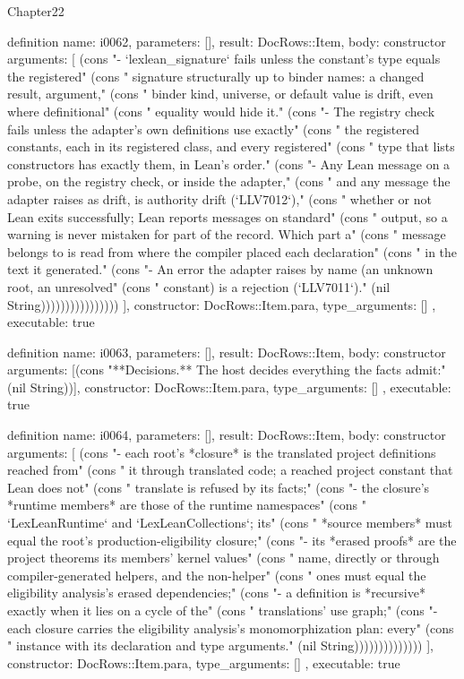 \begin{lexlean}{Chapter22}
\begin{semanticmodule}
definition{
  name: i0062,
  parameters: [],
  result: DocRows::Item,
  body: constructor{
    arguments: [
      (cons "- `lexlean_signature` fails unless the constant's type equals the registered" (cons "  signature structurally up to binder names: a changed result, argument," (cons "  binder kind, universe, or default value is drift, even where definitional" (cons "  equality would hide it." (cons "- The registry check fails unless the adapter's own definitions use exactly" (cons "  the registered constants, each in its registered class, and every registered" (cons "  type that lists constructors has exactly them, in Lean's order." (cons "- Any Lean message on a probe, on the registry check, or inside the adapter," (cons "  and any message the adapter raises as drift, is authority drift (`LLV7012`)," (cons "  whether or not Lean exits successfully; Lean reports messages on standard" (cons "  output, so a warning is never mistaken for part of the record. Which part a" (cons "  message belongs to is read from where the compiler placed each declaration" (cons "  in the text it generated." (cons "- An error the adapter raises by name (an unknown root, an unresolved" (cons "  constant) is a rejection (`LLV7011`)." (nil String))))))))))))))))
    ],
    constructor: DocRows::Item.para,
    type_arguments: []
  },
  executable: true
}

definition{
  name: i0063,
  parameters: [],
  result: DocRows::Item,
  body: constructor{
    arguments: [(cons "**Decisions.** The host decides everything the facts admit:" (nil String))],
    constructor: DocRows::Item.para,
    type_arguments: []
  },
  executable: true
}

definition{
  name: i0064,
  parameters: [],
  result: DocRows::Item,
  body: constructor{
    arguments: [
      (cons "- each root's *closure* is the translated project definitions reached from" (cons "  it through translated code; a reached project constant that Lean does not" (cons "  translate is refused by its facts;" (cons "- the closure's *runtime members* are those of the runtime namespaces" (cons "  `LexLeanRuntime` and `LexLeanCollections`; its" (cons "  *source members* must equal the root's production-eligibility closure;" (cons "- its *erased proofs* are the project theorems its members' kernel values" (cons "  name, directly or through compiler-generated helpers, and the non-helper" (cons "  ones must equal the eligibility analysis's erased dependencies;" (cons "- a definition is *recursive* exactly when it lies on a cycle of the" (cons "  translations' use graph;" (cons "- each closure carries the eligibility analysis's monomorphization plan: every" (cons "  instance with its declaration and type arguments." (nil String))))))))))))))
    ],
    constructor: DocRows::Item.para,
    type_arguments: []
  },
  executable: true
}


\end{semanticmodule}
\end{lexlean}
